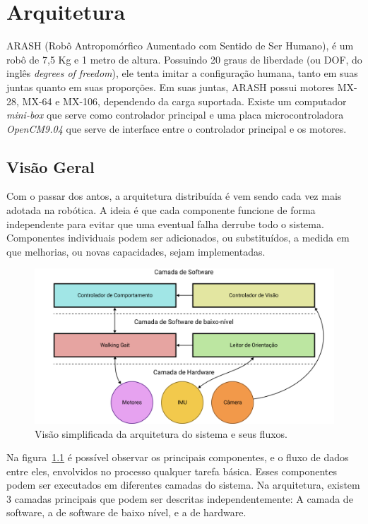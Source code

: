 \chapter{Arquitetura}

ARASH (Robô Antropomórfico Aumentado com Sentido de Ser Humano), é um robô de 7,5 Kg e 1 metro de altura. Possuindo 20 graus de liberdade (ou DOF, do inglês \textit{degrees of freedom}), ele tenta imitar a configuração humana, tanto em suas juntas quanto em suas proporções. Em suas juntas, ARASH possui motores MX-28, MX-64 e MX-106, dependendo da carga suportada. Existe um computador \textit{mini-box} que serve como controlador principal e uma placa microcontroladora \textit{OpenCM9.04} que serve de interface entre o controlador principal e os motores.

\section{Visão Geral}
\label{sec:architecture:overview}

Com o passar dos antos, a arquitetura distribuída é vem sendo cada vez mais adotada na robótica. A ideia é que cada componente funcione de forma independente para evitar que uma eventual falha derrube todo o sistema. Componentes individuais podem ser adicionados, ou substituídos, a medida em que melhorias, ou novas capacidades, sejam implementadas.

\begin{figure}[htb]
	\centering
	\includegraphics[scale=1]{imagens/svg/softwarearchitecture-flow}
	\caption{Visão simplificada da arquitetura do sistema e seus fluxos.}
	\label{fig:softwarearchitecture:overview}
\end{figure}

Na figura~\ref{fig:softwarearchitecture:overview} é possível observar os principais componentes, e o fluxo de dados entre eles, envolvidos no processo qualquer tarefa básica. Esses componentes podem ser executados em diferentes camadas do sistema. Na arquitetura, existem 3 camadas principais que podem ser descritas independentemente: A camada de software, a de software de baixo nível, e a de hardware.

